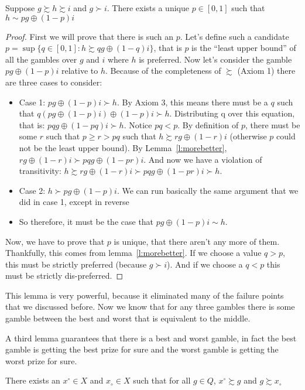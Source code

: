 \begin{lemma}
\label{l:vnm-indiffpoint}
Suppose $g \succsim h \succsim i$ and $g \succ i$.  There exists a unique $p \in [0,1] $ such that $h \sim p g \oplus (1-p)i$
\end{lemma}

\begin{proof}
First we will prove that there is such an $p$.  Let's define such a candidate $p = \sup\{q \in [0,1]: h \succsim qg \oplus (1-q)i\}$, that is $p$ is the ``least upper bound'' of all the gambles over $g$ and $i$ where $h$ is preferred.  Now let's consider the gamble $p g \oplus (1-p) i$ relative to $h$.  Because of the completeness of $\succsim$ (Axiom 1) there are three cases to consider:
\begin{itemize}
    \item Case 1: $p g \oplus (1-p) i \succ h$. By Axiom 3, this means there must be a $q$ such that $ q (p g \oplus (1-p) i) \oplus (1-p) i \succ h$. Distributing q over this equation, that is: $pq g \oplus (1 - pq) i \succ h$.  Notice $pq < p$. By definition of $p$, there must be some $r$ such that $p \geq r > pq$ such that $h \succsim rg \oplus (1-r)i$ (otherwise $p$ could not be the least upper bound). By Lemma~\ref{l:morebetter}, $rg \oplus (1-r)i \succ pq g \oplus (1-pr)i$.  And now we have a violation of transitivity: $h \succsim rg \oplus (1-r)i \succ pq g \oplus (1-pr)i \succ h$.
    \item Case 2: $h \succ p g \oplus (1-p) i$. We can run basically the same argument that we did in case 1, except in reverse
    \item So therefore, it must be the case that $pg \oplus (1-p) i \sim h$.
\end{itemize}

Now, we have to prove that $p$ is unique, that there aren't any more of them. Thankfully, this comes from lemma~\ref{l:morebetter}.  If we choose a value $q > p$, this must be strictly preferred (because $g \succ i$).  And if we choose a $q < p$ this must be strictly dis-preferred.
\end{proof}

This lemma is very powerful, because it eliminated many of the failure points that we discussed before.  Now we know that for any three gambles there is some gamble between the best and worst that is equivalent to the middle.

A third lemma guarantees that there is a best and worst gamble, in fact the best gamble is getting the best prize for sure and the worst gamble is getting the worst prize for sure.
\begin{lemma}
\label{l:vnm-max}
There exists an $x^\circ \in X$ and $x_\circ \in X$ such that for all $g \in Q$, $x^\circ \succsim g$ and $g \succsim x_\circ $
\end{lemma}

